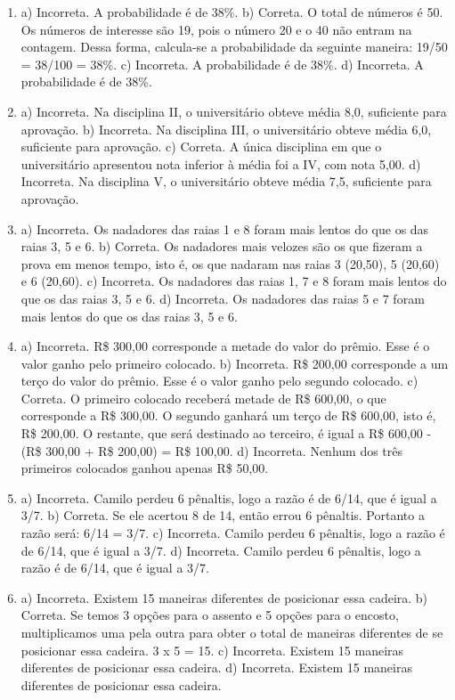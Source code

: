 \begin{enumerate}
\item
a) Incorreta. A probabilidade é de 38\%.
b) Correta. O total de números é 50. Os números de interesse são 19, 
pois o número 20 e o 40 não entram na contagem. Dessa forma, calcula-se
a probabilidade da seguinte maneira: 19/50 = 38/100 = 38\%.
c) Incorreta. A probabilidade é de 38\%.
d) Incorreta. A probabilidade é de 38\%.

\item
a) Incorreta. Na disciplina II, o universitário obteve média 8,0,
suficiente para aprovação. 
b) Incorreta. Na disciplina III, o universitário obteve média 6,0,
suficiente para aprovação. 
c) Correta. A única disciplina em que o universitário apresentou 
nota inferior à média foi a IV, com nota 5,00.
d) Incorreta. Na disciplina V, o universitário obteve média 7,5,
suficiente para aprovação.

\item
a) Incorreta. Os nadadores das raias 1 e 8 foram mais lentos do que
os das raias 3, 5 e 6. 
b) Correta. Os nadadores mais velozes são os que fizeram a prova em
menos tempo, isto é, os que nadaram nas raias 3 (20,50), 5 (20,60) 
e 6 (20,60).
c) Incorreta. Os nadadores das raias 1, 7 e 8 foram mais lentos do que
os das raias 3, 5 e 6.
d) Incorreta. Os nadadores das raias 5 e 7 foram mais lentos do que
os das raias 3, 5 e 6.

\item
a) Incorreta. R\$ 300,00 corresponde a metade do valor do prêmio. Esse é
o valor ganho pelo primeiro colocado.
b) Incorreta. R\$ 200,00 corresponde a um terço do valor do prêmio. Esse é
o valor ganho pelo segundo colocado.
c) Correta. O primeiro colocado receberá metade de R\$ 600,00, 
o que corresponde a R\$ 300,00. O segundo ganhará um terço de
R\$ 600,00, isto é, R\$ 200,00. O restante, que será destinado ao
terceiro, é igual a R\$ 600,00 - (R\$ 300,00 + R\$ 200,00) = R\$ 100,00.
d) Incorreta. Nenhum dos três primeiros colocados ganhou apenas 
R\$ 50,00.

\item
a) Incorreta. Camilo perdeu 6 pênaltis, logo a razão é de 6/14, que 
é igual a 3/7.
b) Correta. Se ele acertou 8 de 14, então errou 6 pênaltis.
Portanto a razão será: 6/14 = 3/7.
c) Incorreta. Camilo perdeu 6 pênaltis, logo a razão é de 6/14, que 
é igual a 3/7.
d) Incorreta. Camilo perdeu 6 pênaltis, logo a razão é de 6/14, que 
é igual a 3/7.

\item
a) Incorreta. Existem 15 maneiras diferentes de posicionar essa cadeira. 
b) Correta. Se temos 3 opções para o assento e 5 opções para o encosto, 
multiplicamos uma pela outra para obter o total de maneiras diferentes 
de se posicionar essa cadeira. 3 x 5 = 15.
c) Incorreta. Existem 15 maneiras diferentes de posicionar essa cadeira.
d) Incorreta. Existem 15 maneiras diferentes de posicionar essa cadeira.


\end{enumerate}
